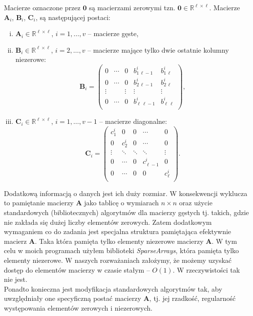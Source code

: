 \documentclass[]{article}
\newcommand{\mA}{\bm{A}}
\newcommand{\mB}{\bm{B}}
\newcommand{\mC}{\bm{C}}
\newcommand{\mZ}{\bm{0}}
\newcommand{\R}{\mathbb{R}}
\begin{document}
	\noindent Macierze oznaczone przez $\mZ$ są macierzami zerowymi tzn. $\mZ \in \R^{\ell\times \ell}$. Macierze $\mA_i$, $\mB_i$, $\mC_i$, są następującej postaci:
	\begin{enumerate}[(i)]
		\item $\mA_i \in \R^{\ell\times \ell}$,   $i = 1, \ldots,v$ -- macierze gęste,
		\item $\mB_i \in \R^{\ell\times \ell}$,   $i = 2, \ldots,v$ -- macierze mające tylko dwie ostatnie kolumny niezerowe:
		\begin{equation}
		\mB_i =
		\left(\begin{array}{ccccc}
		0 & \cdots & 0 & b_{1\,\ell-1}^i & b_{1\,\ell}^i \\
		0 & \cdots & 0 & b_{2\,\ell-1}^i & b_{2\,\ell}^i \\
		\vdots & & \vdots & \vdots & \vdots \\
		0 & \cdots & 0 & b_{\ell\,\ell-1}^i & b_{\ell\,\ell}^i \\
		\end{array}\right),
		\end{equation} 
		\item $\mC_i \in \R^{\ell\times \ell}$,   $i = 1, \ldots,v\!-\!1$ -- macierze diagonalne:
		\begin{equation}
		\mC_i =
		\left(\begin{array}{ccccc}
		c_{1}^i & 0 & 0 & \cdots & 0  \\
		0 &  c_{2}^i &  0 & \cdots & 0  \\
		\vdots &  \ddots &  \ddots & \ddots & \vdots  \\
		0 & \cdots & 0 &  c_{\ell-1}^i & 0 \\
		0 & \cdots & 0 &  0 & c_{\ell}^i \\
		\end{array}\right).
		\end{equation} 
	\end{enumerate}

	Dodatkową informacją o danych jest ich duży rozmiar. W konsekwencji wyklucza to pamiętanie macierzy $\mA$ jako tablicę o wymiarach $n \times n$ oraz użycie standardowych (bibliotecznych) algorytmów dla macierzy gęstych tj. takich, gdzie
	nie zakłada się dużej liczby elementów zerowych. Zatem dodatkowym wymaganiem co do zadania jest specjalna struktura pamiętająca efektywnie macierz $\mA$. Taka która pamięta tylko elementy niezerowe macierzy $\mA$. W tym celu w moich programach użyłem biblioteki \textit{SparseArrays}, która pamięta tylko elementy niezerowe. W naszych rozważaniach założymy, że możemy uzyskać dostęp do elementów macierzy w czasie stałym -- $O(1)$. W rzeczywistości tak nie jest. \\
	Ponadto konieczna jest modyfikacja standardowych algorytmów tak, aby uwzględniały one specyficzną postać macierzy $\mA$, tj.
	jej rzadkość, regularność występowania elementów zerowych i niezerowych.\\
	
\end{document}
